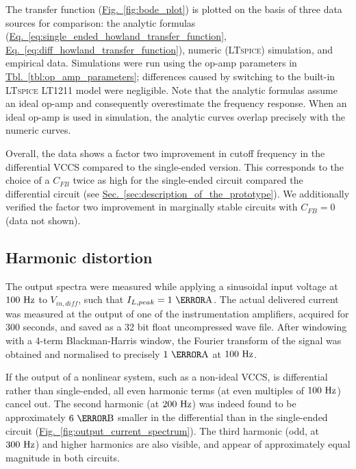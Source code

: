 \documentclass[10pt]{article}
\newcommand{\brieftbllink}[1]{\hyperref[#1]{Tbl.~\ref*{#1}}\xspace }
\newcommand{\briefeqlink}[1]{\hyperref[#1]{Eq.~\ref*{#1}}\xspace }
\newcommand{\briefseclink}[1]{\hyperref[#1]{Sec.~\ref*{#1}}}
\newcommand{\brieffiglink}[1]{\hyperref[#1]{Fig.~\ref*{#1}}}
\begin{document}
The transfer function (\brieffiglink{fig:bode_plot}) is plotted on the basis of three data sources for comparison: the analytic formulas (\briefeqlink{eq:single_ended_howland_transfer_function}, \briefeqlink{eq:diff_howland_transfer_function}), numeric (\textsc{LTspice}) simulation, and empirical data. Simulations were run using the op-amp parameters in \brieftbllink{tbl:op_amp_parameters}; differences caused by switching to the built-in \textsc{LTspice} LT1211 model were negligible. Note that the analytic formulas assume an ideal op-amp and consequently overestimate the frequency response. When an ideal op-amp is used in simulation, the analytic curves overlap precisely with the numeric curves.

Overall, the data shows a factor two improvement in cutoff frequency in the differential VCCS compared to the single-ended version. This corresponds to the choice of a $C_{FB}$ twice as high for the single-ended circuit compared the differential circuit (see \briefseclink{sec:description_of_the_prototype}). We additionally verified the factor two improvement in marginally stable circuits with $C_{FB}=0$ (data not shown).



\subsection{Harmonic distortion}

The output spectra were measured while applying a sinusoidal input voltage at $100~\hertz$ to $V_{in,diff}$, such that $I_{L,peak}=1~\milli\ampere$. The actual delivered current was measured at the output of one of the instrumentation amplifiers, acquired for 300 seconds, and saved as a 32 bit float uncompressed wave file. After windowing with a 4-term Blackman-Harris window, the Fourier transform of the signal was obtained and normalised to precisely $1~\milli\ampere$ at $100~\hertz$.

If the output of a nonlinear system, such as a non-ideal VCCS, is differential rather than single-ended, all even harmonic terms (at even multiples of $100~\hertz$) cancel out. The second harmonic (at $200~\hertz$) was indeed found to be approximately $6~\deci\bel$ smaller in the differential than in the single-ended circuit (\brieffiglink{fig:output_current_spectrum}). The third harmonic (odd, at $300~\hertz$) and higher harmonics are also visible, and appear of approximately equal magnitude in both circuits.
\end{document}
